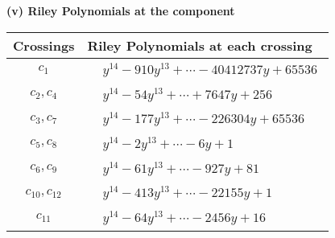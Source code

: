 \documentclass[1p]{elsarticle_modified}
\theoremstyle{definition}
\begin{document}
\flushleft \textbf{(v) Riley Polynomials at the component}\newline \\
\begin{tabular}{m{50pt}|m{274pt}}
Crossings & \hspace{64pt}Riley Polynomials at each crossing \\
\hline $$\begin{aligned}c_{1}\end{aligned}$$&$\begin{aligned}
&y^{14}-910 y^{13}+\cdots-40412737 y+65536
\end{aligned}$\\
\hline $$\begin{aligned}c_{2},c_{4}\end{aligned}$$&$\begin{aligned}
&y^{14}-54 y^{13}+\cdots+7647 y+256
\end{aligned}$\\
\hline $$\begin{aligned}c_{3},c_{7}\end{aligned}$$&$\begin{aligned}
&y^{14}-177 y^{13}+\cdots-226304 y+65536
\end{aligned}$\\
\hline $$\begin{aligned}c_{5},c_{8}\end{aligned}$$&$\begin{aligned}
&y^{14}-2 y^{13}+\cdots-6 y+1
\end{aligned}$\\
\hline $$\begin{aligned}c_{6},c_{9}\end{aligned}$$&$\begin{aligned}
&y^{14}-61 y^{13}+\cdots-927 y+81
\end{aligned}$\\
\hline $$\begin{aligned}c_{10},c_{12}\end{aligned}$$&$\begin{aligned}
&y^{14}-413 y^{13}+\cdots-22155 y+1
\end{aligned}$\\
\hline $$\begin{aligned}c_{11}\end{aligned}$$&$\begin{aligned}
&y^{14}-64 y^{13}+\cdots-2456 y+16
\end{aligned}$\\
\hline
\end{tabular}\\~\\
\end{document}
